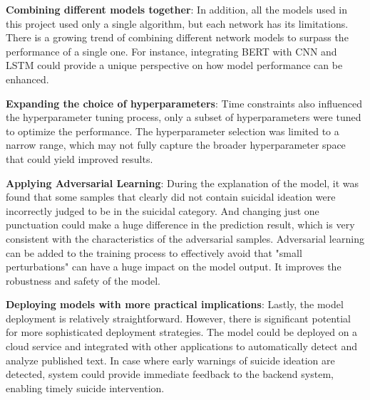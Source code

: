 \documentclass[ %
                    author={Bocheng Wang},
                supervisor={Dr. Qiang Liu},
                    degree={MSc},
                     title={A Research on Identification of Suicide Ideation in Texts with Multiple Models},
                      type={},
                      year={2024}]{dissertation}
\begin{document}
\textbf{Combining different models together}: In addition, all the models used in this project used only a single algorithm, but each network has its limitations. There is a growing trend of combining different network models to surpass the performance of a single one. For instance, integrating BERT with CNN and LSTM could provide a unique perspective on how model performance can be enhanced.

\textbf{Expanding the choice of hyperparameters}: Time constraints also influenced the hyperparameter tuning process, only a subset of hyperparameters were tuned to optimize the performance. The hyperparameter selection was limited to a narrow range, which may not fully capture the broader hyperparameter space that could yield improved results.

\textbf{Applying Adversarial Learning}: During the explanation of the model, it was found that some samples that clearly did not contain suicidal ideation were incorrectly judged to be in the suicidal category. And changing just one punctuation could make a huge difference in the prediction result, which is very consistent with the characteristics of the adversarial samples. Adversarial learning\cite{2013Intriguing} can be added to the training process to effectively avoid that "small perturbations" can have a huge impact on the model output. It improves the robustness and safety of the model.

\textbf{Deploying models with more practical implications}: Lastly, the model deployment is relatively straightforward. However, there is significant potential for more sophisticated deployment strategies. The model could be deployed on a cloud service and integrated with other applications to automatically detect and analyze published text. In case where early warnings of suicide ideation are detected, system could provide immediate feedback to the backend system, enabling timely suicide intervention.


%
%
\end{document}
